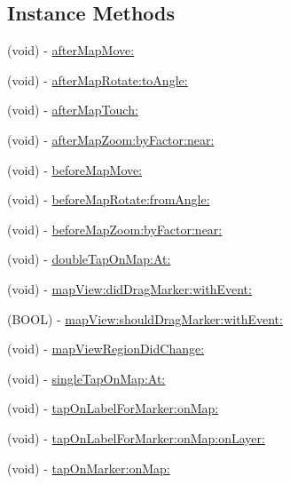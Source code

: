 \subsection*{Instance Methods}
\begin{DoxyCompactItemize}
\item 
(void) -\/ \hyperlink{protocol_r_m_map_view_delegate-p_a9b10956deeb8c0aeea94459bcb7b64b3}{after\-Map\-Move\-:}
\item 
(void) -\/ \hyperlink{protocol_r_m_map_view_delegate-p_a29d89b73151a5664e0757a1d36f93bdc}{after\-Map\-Rotate\-:to\-Angle\-:}
\item 
(void) -\/ \hyperlink{protocol_r_m_map_view_delegate-p_ab543918d0dfc6867db316eb66c460a83}{after\-Map\-Touch\-:}
\item 
(void) -\/ \hyperlink{protocol_r_m_map_view_delegate-p_a7785a3e85147f25316911d1cfaba276f}{after\-Map\-Zoom\-:by\-Factor\-:near\-:}
\item 
(void) -\/ \hyperlink{protocol_r_m_map_view_delegate-p_a020ebef5aa265d5452eecfa2eb4bda67}{before\-Map\-Move\-:}
\item 
(void) -\/ \hyperlink{protocol_r_m_map_view_delegate-p_a7e359b6183df46871ca7ffcb1f16cd59}{before\-Map\-Rotate\-:from\-Angle\-:}
\item 
(void) -\/ \hyperlink{protocol_r_m_map_view_delegate-p_a4e2099bacfe277f836c3e3fc4a93380d}{before\-Map\-Zoom\-:by\-Factor\-:near\-:}
\item 
(void) -\/ \hyperlink{protocol_r_m_map_view_delegate-p_a99bff74285b7262100f01a88eba695f5}{double\-Tap\-On\-Map\-:\-At\-:}
\item 
(void) -\/ \hyperlink{protocol_r_m_map_view_delegate-p_aaa7e0809e8b6761b3b84b717e2e1a251}{map\-View\-:did\-Drag\-Marker\-:with\-Event\-:}
\item 
(B\-O\-O\-L) -\/ \hyperlink{protocol_r_m_map_view_delegate-p_a02978876a2f774fc8165d0361dc52e90}{map\-View\-:should\-Drag\-Marker\-:with\-Event\-:}
\item 
(void) -\/ \hyperlink{protocol_r_m_map_view_delegate-p_a2ceb25e49bf55ddfe0f143148bf38396}{map\-View\-Region\-Did\-Change\-:}
\item 
(void) -\/ \hyperlink{protocol_r_m_map_view_delegate-p_ae8c30f1096a3524c51d6dd9e7da8a579}{single\-Tap\-On\-Map\-:\-At\-:}
\item 
(void) -\/ \hyperlink{protocol_r_m_map_view_delegate-p_a63f6c30db8812335f3a69cec9ef09783}{tap\-On\-Label\-For\-Marker\-:on\-Map\-:}
\item 
(void) -\/ \hyperlink{protocol_r_m_map_view_delegate-p_aca2e3042ef2bd1c8706c229f281730fc}{tap\-On\-Label\-For\-Marker\-:on\-Map\-:on\-Layer\-:}
\item 
(void) -\/ \hyperlink{protocol_r_m_map_view_delegate-p_aca0a4ab85c0220a9c2552e6cf1bd62c5}{tap\-On\-Marker\-:on\-Map\-:}
\end{DoxyCompactItemize}


